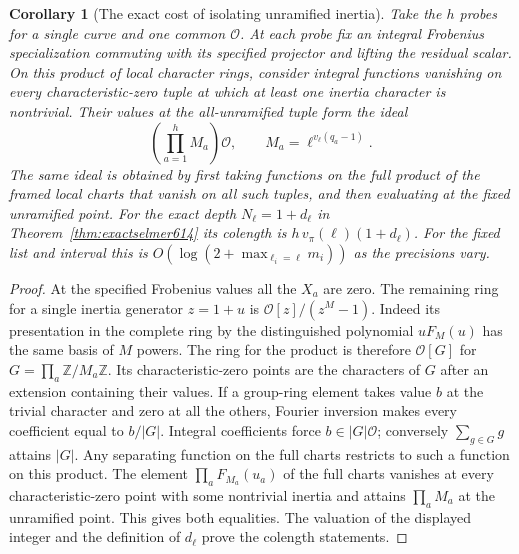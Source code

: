 \documentclass[a4paper,11pt]{article}
\newtheorem{corollary}[proposition]{Corollary}
\theoremstyle{definition}
\theoremstyle{remark}
\newcommand{\ZZ}{\mathbb Z}\newcommand{\ord}{\operatorname{ord}}
\numberwithin{equation}{section}
\begin{document}
\begin{corollary}[The exact cost of isolating unramified inertia]
\leavevmode\label{cor:selmercongruence614}
Take the \(h\) probes for a single curve and one common
\(\mathcal O\). At each probe fix an integral Frobenius
specialization commuting with its specified projector and lifting
the residual scalar. On this product of local character rings,
consider integral functions vanishing on every characteristic-zero
tuple at which at least one inertia character is nontrivial.
Their values at the all-unramified tuple form the ideal
\[
        \left(\prod_{a=1}^h M_a\right)\mathcal O,\qquad
        M_a=\ell^{v_\ell(q_a-1)} .
\]
The same ideal is obtained by first taking functions on the full
product of the framed local charts that vanish on all such tuples,
and then evaluating at the fixed unramified point. For the exact
depth \(N_\ell=1+d_\ell\) in Theorem~\ref{thm:exactselmer614}
its colength is \(h\,v_\pi(\ell)(1+d_\ell)\).
For the fixed list and interval this is
\(O(\log(2+\max_{\ell_i=\ell} m_i))\) as the precisions vary.
\end{corollary}
\begin{proof}
At the specified Frobenius values all the \(X_a\) are zero.
The remaining ring for a single inertia generator \(z=1+u\)
is \(\mathcal O[z]/(z^M-1)\). Indeed its presentation in the
complete ring by the distinguished polynomial \(uF_M(u)\)
has the same basis of \(M\) powers. The ring for the product
is therefore \(\mathcal O[G]\) for \(G=\prod_a\ZZ/M_a\ZZ\).
Its characteristic-zero points are the characters of \(G\)
after an extension containing their values. If a group-ring
element takes value \(b\) at the trivial character and zero
at all the others, Fourier inversion makes every coefficient
equal to \(b/|G|\). Integral coefficients force
\(b\in |G|\mathcal O\); conversely \(\sum_{g\in G}g\) attains
\(|G|\). Any separating function on the full charts restricts
to such a function on this product. The element
\(\prod_aF_{M_a}(u_a)\) of the full charts vanishes at every
characteristic-zero point with some nontrivial inertia and
attains \(\prod_a M_a\) at the unramified point. This gives both
equalities. The valuation of the displayed integer and the
definition of \(d_\ell\) prove the colength statements.
\end{proof}
\end{document}
